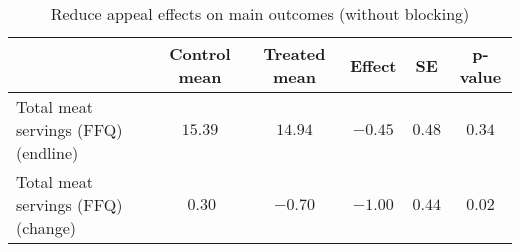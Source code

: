 \begin{table*}[ht]
\caption{Reduce appeal effects on main outcomes (without blocking)\label{round}} 
\begin{center}
\begin{tabular}{lccccc}
\hline\hline
\multicolumn{1}{l}{}&\multicolumn{1}{c}{Control mean}&\multicolumn{1}{c}{Treated mean}&\multicolumn{1}{c}{Effect}&\multicolumn{1}{c}{SE}&\multicolumn{1}{c}{p-value}\tabularnewline
\hline
Total meat servings (FFQ) (endline)&$15.39$&$14.94$&$-0.45$&$0.48$&$0.34$\tabularnewline
Total meat servings (FFQ) (change)&$~0.30$&$-0.70$&$-1.00$&$0.44$&$0.02$\tabularnewline
\hline
\end{tabular}\end{center}

\end{table*}
